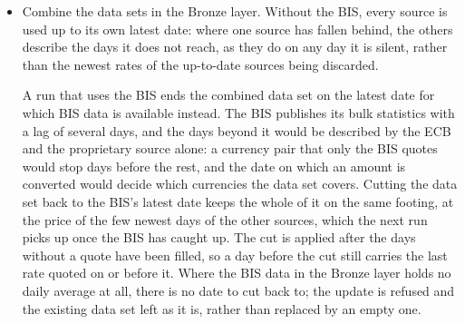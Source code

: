 \begin{itemize}
	The file is checked before it is combined, and refused as a whole where a row would be misread: a reference date not written as \verb|YYYY-MM-DD|, a base currency other than the euro, a rate that is missing or not positive, or one day and currency pair quoted twice. The first of these matters most. The combination compares reference dates as text -- to decide which source wins a day and to order the quotes of a currency pair -- so a date written differently from the ECB's is not the same day to it. Without the check, a single row dated \verb|2020-10-5| would not meet the ECB's quote of 5 October at all: it would be kept beside it as a second rate for that day, and it would be misplaced among the quotes of its pair, because \verb|2020-10-5| sorts after \verb|2020-10-06| as text.
	\item Combine the data sets in the Bronze layer. Without the BIS, every source is used up to its own latest date: where one source has fallen behind, the others describe the days it does not reach, as they do on any day it is silent, rather than the newest rates of the up-to-date sources being discarded.

	A run that uses the BIS ends the combined data set on the latest date for which BIS data is available instead. The BIS publishes its bulk statistics with a lag of several days, and the days beyond it would be described by the ECB and the proprietary source alone: a currency pair that only the BIS quotes would stop days before the rest, and the date on which an amount is converted would decide which currencies the data set covers. Cutting the data set back to the BIS's latest date keeps the whole of it on the same footing, at the price of the few newest days of the other sources, which the next run picks up once the BIS has caught up. The cut is applied after the days without a quote have been filled, so a day before the cut still carries the last rate quoted on or before it. Where the BIS data in the Bronze layer holds no daily average at all, there is no date to cut back to; the update is refused and the existing data set left as it is, rather than replaced by an empty one.


\end{itemize}
